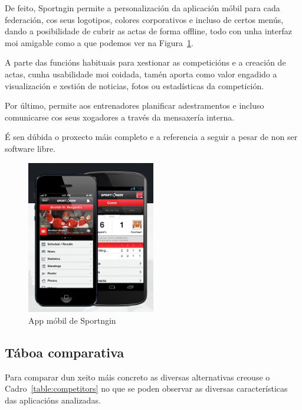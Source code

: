     De feito, Sportngin permite a personalización da aplicación móbil para 
cada federación, cos seus logotipos, colores corporativos e incluso de certos 
menús, dando a posibilidade de cubrir as actas de forma offline, todo con unha 
interfaz moi amigable como a que podemos ver na Figura~\ref{fig:img:sportngin}.

    A parte das funcións habituais para xestionar as competicións e a creación 
de actas, cunha usabilidade moi coidada, tamén aporta como valor engadido a 
visualización e xestión de noticias, fotos ou estadísticas da competición.

    Por último, permite aos entrenadores planificar adestramentos e incluso 
comunicarse cos seus xogadores a través da mensaxería interna.

    É sen dúbida o proxecto máis completo e a referencia a seguir a pesar de 
non ser software libre.

    \begin{figure}[h!]
      \begin{center}
	\includegraphics[width=0.5\textwidth]{./img/sportngin-app.png}
	\caption{App móbil de Sportngin}
	\label{fig:img:sportngin}
      \end{center}
    \end{figure}

    \clearpage

    \subsection{Táboa comparativa}

    Para comparar dun xeito máis concreto as diversas alternativas creouse o 
Cadro~\ref{table:competitors} no que se poden observar as diversas 
características das aplicacións analizadas.

